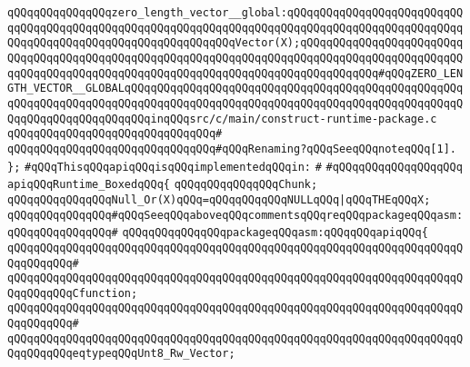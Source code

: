 \verb|qQQqqQQqqQQqqQQqzero_length_vector__global:qQQqqQQqqQQqqQQqqQQqqQQqqQQqqQQqqQQqqQQqqQQqqQQqqQQqqQQqqQQqqQQqqQQqqQQqqQQqqQQqqQQqqQQqqQQqqQQqqQQqqQQqqQQqqQQqqQQqqQQqqQQqqQQqqQQqVector(X);qQQqqQQqqQQqqQQqqQQqqQQqqQQqqQQqqQQqqQQqqQQqqQQqqQQqqQQqqQQqqQQqqQQqqQQqqQQqqQQqqQQqqQQqqQQqqQQqqQQqqQQqqQQqqQQqqQQqqQQqqQQqqQQqqQQqqQQqqQQqqQQqqQQqqQQq#qQQqZERO_LENGTH_VECTOR__GLOBALqQQqqQQqqQQqqQQqqQQqqQQqqQQqqQQqqQQqqQQqqQQqqQQqqQQqqQQqqQQqqQQqqQQqqQQqqQQqqQQqqQQqqQQqqQQqqQQqqQQqqQQqqQQqqQQqqQQqqQQqqQQqqQQqqQQqqQQqqQQqqQQqinqQQqsrc/c/main/construct-runtime-package.c|\newline
\verb|qQQqqQQqqQQqqQQqqQQqqQQqqQQqqQQq#|\newline
\verb|qQQqqQQqqQQqqQQqqQQqqQQqqQQqqQQq#qQQqRenaming?qQQqSeeqQQqnoteqQQq[1].|\newline
\verb|};|\newline
\newline
\newline
\verb|#qQQqThisqQQqapiqQQqisqQQqimplementedqQQqin:|\newline
\verb|#|\newline
\verb|#qQQqqQQqqQQqqQQqqQQq|\newline
\newline
\verb|apiqQQqRuntime_BoxedqQQq{|\newline
\newline
\verb|qQQqqQQqqQQqqQQqChunk;|\newline
\newline
\verb|qQQqqQQqqQQqqQQqNull_Or(X)qQQq=qQQqqQQqqQQqNULLqQQq|\verb#|qQQqTHEqQQqX;#\newline
\newline
\verb|qQQqqQQqqQQqqQQq#qQQqSeeqQQqaboveqQQqcommentsqQQqreqQQqpackageqQQqasm:|\newline
\verb|qQQqqQQqqQQqqQQq#|\newline
\verb|qQQqqQQqqQQqqQQqpackageqQQqasm:qQQqqQQqapiqQQq{|\newline
\verb|qQQqqQQqqQQqqQQqqQQqqQQqqQQqqQQqqQQqqQQqqQQqqQQqqQQqqQQqqQQqqQQqqQQqqQQqqQQqqQQq#|\newline
\verb|qQQqqQQqqQQqqQQqqQQqqQQqqQQqqQQqqQQqqQQqqQQqqQQqqQQqqQQqqQQqqQQqqQQqqQQqqQQqqQQqCfunction;|\newline
\verb|qQQqqQQqqQQqqQQqqQQqqQQqqQQqqQQqqQQqqQQqqQQqqQQqqQQqqQQqqQQqqQQqqQQqqQQqqQQqqQQq#|\newline
\verb|qQQqqQQqqQQqqQQqqQQqqQQqqQQqqQQqqQQqqQQqqQQqqQQqqQQqqQQqqQQqqQQqqQQqqQQqqQQqqQQqeqtypeqQQqUnt8_Rw_Vector;|\newline
